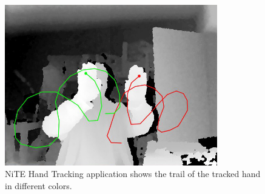 \begin{figure}
	[h] \centering 
	\includegraphics[height=7cm]{figures/content/ni-hand.jpg} \caption{NiTE Hand Tracking application shows the trail of the tracked hand in different colors. } \label{fg:ni:hand} 
\end{figure}
